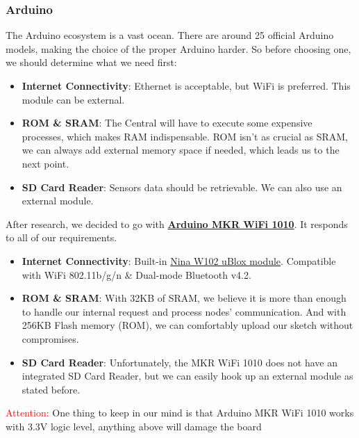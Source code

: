 \subsubsection{Arduino}
The Arduino ecosystem is a vast ocean. There are around 25 official Arduino models, making the choice of the proper Arduino harder. So before choosing one, we should determine what we need first:
\begin{itemize}
    \item \textbf{Internet Connectivity}: Ethernet is acceptable, but WiFi is preferred. This module can be external.
    \item \textbf{ROM \& SRAM}: The Central will have to execute some expensive processes, which makes RAM indispensable. ROM isn't as crucial as SRAM, we can always add external memory space if needed, which leads us to the next point.
    \item \textbf{SD Card Reader}: Sensors data should be retrievable. We can also use an external module.
\end{itemize}
After research, we decided to go with \textbf{\href{https://docs.arduino.cc/hardware/mkr-wifi-1010}{Arduino MKR WiFi 1010}}. It responds to all of our requirements.
\begin{itemize}
    \item \textbf{Internet Connectivity}: Built-in \href{https://www.u-blox.com/en/product/nina-w10-series-open-cpu}{Nina W102 uBlox module}. Compatible with WiFi 802.11b/g/n \& Dual-mode Bluetooth v4.2.
    \item \textbf{ROM \& SRAM}: With 32KB of SRAM, we believe it is more than enough to handle our internal request and process nodes' communication. And with 256KB Flash memory (ROM), we can comfortably upload our sketch without compromises.
    \item \textbf{SD Card Reader}: Unfortunately, the MKR WiFi 1010 does not have an integrated SD Card Reader, but we can easily hook up an external module as stated before. 
\end{itemize}
\textcolor{red}{Attention:} One thing to keep in our mind is that Arduino MKR WiFi 1010 works with 3.3V logic level, anything above will damage the board

